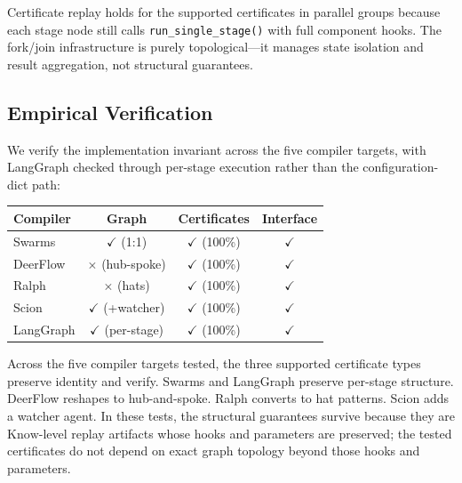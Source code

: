 Certificate replay holds for the supported certificates in parallel groups because each stage node still calls \texttt{run\_single\_stage()} with full component hooks.  The fork/join infrastructure is purely topological---it manages state isolation and result aggregation, not structural guarantees.

\subsection{Empirical Verification}

We verify the implementation invariant across the five compiler targets, with LangGraph checked through per-stage execution rather than the configuration-dict path:

\begin{center}
\small
\begin{tabular}{@{}lccc@{}}
\toprule
\textbf{Compiler} & \textbf{Graph} & \textbf{Certificates} & \textbf{Interface} \\
\midrule
Swarms & $\checkmark$ (1:1) & $\checkmark$ (100\%) & $\checkmark$ \\
DeerFlow & $\times$ (hub-spoke) & $\checkmark$ (100\%) & $\checkmark$ \\
Ralph & $\times$ (hats) & $\checkmark$ (100\%) & $\checkmark$ \\
Scion & $\checkmark$ (+watcher) & $\checkmark$ (100\%) & $\checkmark$ \\
LangGraph & $\checkmark$ (per-stage) & $\checkmark$ (100\%) & $\checkmark$ \\
\bottomrule
\end{tabular}
\end{center}

Across the five compiler targets tested, the three supported certificate types preserve identity and verify. Swarms and LangGraph preserve per-stage structure. DeerFlow reshapes to hub-and-spoke. Ralph converts to hat patterns. Scion adds a watcher agent. In these tests, the structural guarantees survive because they are $\mathrm{Know}$-level replay artifacts whose hooks and parameters are preserved; the tested certificates do not depend on exact graph topology beyond those hooks and parameters.
